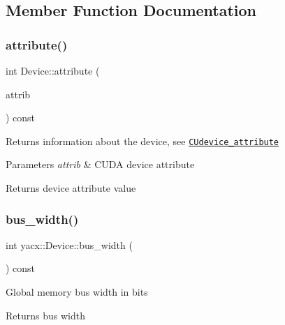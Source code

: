 \subsection{Member Function Documentation}
\mbox{\label{classyacx_1_1_device_aff8748b38646df669d7b29d03dc18077}} 
\subsubsection{\texorpdfstring{attribute()}{attribute()}}
{\footnotesize\ttfamily int Device\+::attribute (\begin{DoxyParamCaption}\item[{C\+Udevice\+\_\+attribute}]{attrib }\end{DoxyParamCaption}) const}

Returns information about the device, see \href{https://docs.nvidia.com/cuda/cuda-driver-api/group__CUDA__DEVICE.html#group__CUDA__DEVICE_1g9c3e1414f0ad901d3278a4d6645fc266}{\tt C\+Udevice\+\_\+attribute} 
\begin{DoxyParams}{Parameters}
{\em attrib} & C\+U\+DA device attribute \\
\hline
\end{DoxyParams}
\begin{DoxyReturn}{Returns}
device attribute value 
\end{DoxyReturn}
\mbox{\label{classyacx_1_1_device_aaec2c2024842d546c46e7ab45abce8c5}} 
\subsubsection{\texorpdfstring{bus\+\_\+width()}{bus\_width()}}
{\footnotesize\ttfamily int yacx\+::\+Device\+::bus\+\_\+width (\begin{DoxyParamCaption}{ }\end{DoxyParamCaption}) const\hspace{0.3cm}{\ttfamily [inline]}}

Global memory bus width in bits \begin{DoxyReturn}{Returns}
bus width 
\end{DoxyReturn}
\mbox{\label{classyacx_1_1_device_a74c7ad2bea44bf536f35c79b9f19528a}} 
